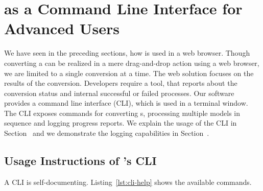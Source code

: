 \documentclass[../ClassicThesis.tex]{subfiles}
\begin{document}

\section{{\platener} as a Command Line Interface for Advanced Users}
\label{sec:walkthrough-cli}

We have seen in the preceding sections, how {\platener} is used in a
web browser.
Though converting a {\threedmodel} can be realized in a mere
drag-and-drop action using a web browser, we are limited to a single
conversion at a time. The web solution focuses on the results of the
conversion. Developers require a tool, that reports about the
conversion status and internal successful or failed processes. Our
software {\platener} provides a command line interface (CLI), which is
used in a terminal window. The CLI exposes commands for converting
{\threedmodel}s, processing multiple models in sequence and logging
progress reports. We explain the usage of the CLI in
Section~ and we demonstrate the logging
capabilities in Section~.

\subsection{Usage Instructions of {\platener}'s CLI}
\label{sec:walkthrough-cli-usage}

A CLI is self-documenting. Listing~\ref{lst:cli-help} shows the
available commands.
\end{document}
